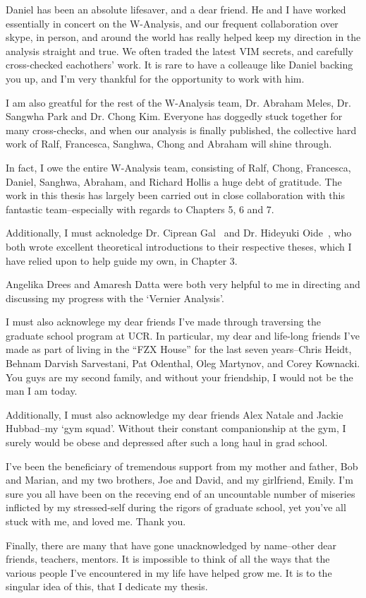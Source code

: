 Daniel has been an absolute lifesaver, and a dear friend. He and I have worked
essentially in concert on the W-Analysis, and our frequent collaboration over
skype, in person, and around the world has really helped keep my direction in
the analysis straight and true.  We often traded the latest VIM secrets, and
carefully cross-checked eachothers' work. It is rare to have a colleauge like
Daniel backing you up, and I'm very thankful for the opportunity to work with
him.

I am also greatful for the rest of the W-Analysis team, Dr. Abraham Meles, Dr.
Sangwha Park and Dr. Chong Kim. Everyone has doggedly stuck together for many
cross-checks, and when our analysis is finally published, the collective hard
work of Ralf, Francesca, Sanghwa, Chong and Abraham will shine through.

In fact, I owe the entire W-Analysis team, consisting of Ralf, Chong,
Francesca, Daniel, Sanghwa, Abraham, and Richard Hollis a huge debt of
gratitude. The work in this thesis has largely been carried out in close
collaboration with this fantastic team--especially with regards to Chapters 5,
6 and 7.

Additionally, I must acknoledge Dr. Ciprean Gal~\cite{Gal2014b} and Dr.
Hideyuki Oide~\cite{Oide2012}, who both wrote excellent theoretical
introductions to their respective theses, which I have relied upon to help
guide my own, in Chapter 3. 

Angelika Drees and Amaresh Datta were both very helpful to me in directing and
discussing my progress with the `Vernier Analysis'.

I must also acknowlege my dear friends I've made through traversing the graduate
school program at UCR. In particular, my dear and life-long friends I've made as
part of living in the ``FZX House'' for the last seven years--Chris Heidt, Behnam
Darvish Sarvestani, Pat Odenthal, Oleg Martynov, and Corey Kownacki. You guys
are my second family, and without your friendship, I would not be the man I am
today.

Additionally, I must also acknowledge my dear friends Alex Natale and Jackie
Hubbad--my `gym squad'. Without their constant companionship at the gym, I
surely would be obese and depressed after such a long haul in grad school.

I've been the beneficiary of tremendous support from my mother and father, Bob
and Marian, and my two brothers, Joe and David, and my girlfriend, Emily.
I'm sure you all have been on the receving end of an uncountable number of
miseries inflicted by my stressed-self during the rigors of graduate school, yet
you've all stuck with me, and loved me.  Thank you.

Finally, there are many that have gone unacknowledged by name--other dear
friends, teachers, mentors. It is impossible to think of all the ways that the
various people I've encountered in my life have helped grow me. It is to the
singular idea of this, that I dedicate my thesis.
